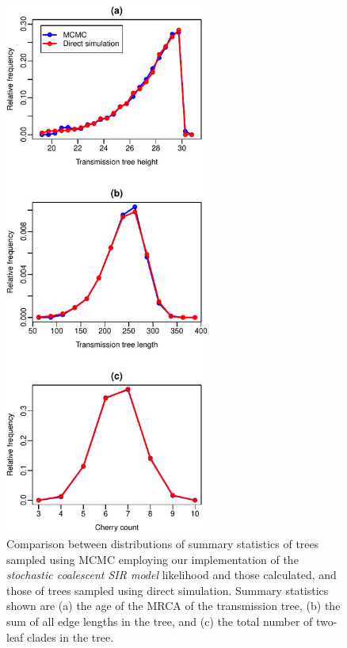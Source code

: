 \documentclass[10pt]{article}
\begin{document}
\begin{figure}
  \vspace{-3cm}

    \begin{center}
      \includegraphics[width=0.6\textwidth]{stochCoalFigure-crop.pdf}
    \end{center}
    \caption{Comparison between distributions of summary statistics of
      trees sampled using MCMC employing our implementation of the
      \emph{stochastic coalescent SIR model} likelihood and those
      calculated, and those of trees sampled using direct
      simulation. Summary statistics shown are (a) the age of the MRCA
      of the transmission tree, (b) the sum of all edge lengths in the
      tree, and (c) the total number of two-leaf clades in the tree.}
    \label{fig:stochCoalValidation}
\end{figure}
\end{document}
